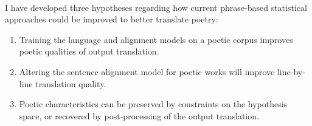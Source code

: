\paragraph{}{I have developed three hypotheses regarding how current
  phrase-based statistical approaches could be improved to better
  translate poetry:}
\begin{enumerate}
\item Training the language and alignment models on a poetic corpus
  improves poetic qualities of output translation.
\item Altering the sentence alignment model for poetic works will
  improve line-by-line translation quality.
\item Poetic characteristics can be preserved by constraints on the
  hypothesis space, or recovered by post-processing of the output
  translation.
\end{enumerate}

